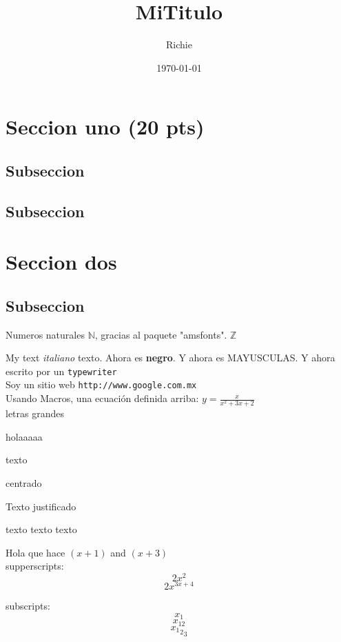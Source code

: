 \documentclass[12pt]{article}
\def\eq1{y=\frac{x}{x^2+3x+2}}
\begin{document}
\tableofcontents

\title{MiTitulo}
\author{Richie}
\date{\today}
\maketitle

\section{Seccion uno (20 pts)}
\subsection{Subseccion}
\subsection{Subseccion}
\section{Seccion dos}
\subsection{Subseccion}


Numeros naturales $\mathbb{N}$, gracias al paquete "amsfonts".
$\mathbb{Z}$

My text \textit{italiano} texto.
Ahora es \textbf{negro}.
Y ahora es  \textsc{MAYUSCULAS}.
Y ahora escrito por un  \texttt{typewriter} \\
Soy un sitio web \texttt{http://www.google.com.mx}\\

Usando Macros, una ecuación definida arriba: $\eq1$
\\
letras grandes \begin{Large}
holaaaaa
\end{Large}

texto \begin{center}
centrado
\end{center}

Texto justificado 
\begin{flushleft}
texto texto texto
\end{flushleft}

Hola que hace $(x+1)$ and $(x+3)$\\

supperscripts:
$$ 2x^2$$
$$ 2x^{3x+4}$$

subscripts:
$$x_1$$
$$x_{12}$$
$${{x_1}_2}_3$$
\end{document}
